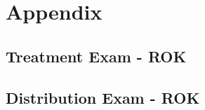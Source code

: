 \documentclass[11pt,fleqn]{book} %
\begin{document}
%
%
%
%
%
%
%
%




\part{Appendix}

\appendix

\renewcommand{\chaptername}{Appendix A: } %

\vfill

\appendix
{} %


\chapter{Treatment Exam - ROK}\label{appendix:Treatment Exam - ROK}


\chapter{Distribution Exam - ROK}\label{appendix:Distribution Exam - ROK}

\end{document}
